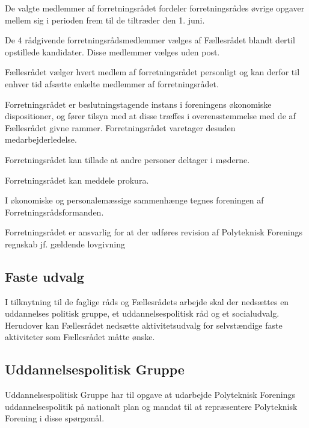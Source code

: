 \begin{list}
 De valgte medlemmer af forretningsrådet fordeler forretningsrådes øvrige opgaver mellem sig i perioden frem til de tiltræder den 1. juni.

 De 4 rådgivende forretningsrådsmedlemmer vælges af Fællesrådet blandt dertil opstillede kandidater. Disse medlemmer vælges uden post.

\item Fællesrådet vælger hvert medlem af forretningsrådet personligt og kan derfor til enhver tid afsætte enkelte medlemmer af forretningsrådet.
\item Forretningsrådet er beslutningstagende instans i foreningens økonomiske dispositioner, og fører tilsyn med at disse træffes i overensstemmelse med de af Fællesrådet givne rammer. Forretningsrådet varetager desuden medarbejderledelse.
\item Forretningsrådet kan tillade at andre personer deltager i møderne.
\item Forretningsrådet kan meddele prokura.
\item I økonomiske og personalemæssige sammenhænge tegnes foreningen af Forretningsrådsformanden.
\item Forretningsrådet er ansvarlig for at der udføres revision af Polyteknisk Forenings regnskab jf. gældende lovgivning	


\subsection{Faste udvalg}
\label{L:kap:fasteUdvalg}
\item I tilknytning til de faglige råds og Fællesrådets arbejde skal der nedsættes en uddannelses politisk gruppe, et uddannelsespolitisk råd og et socialudvalg. Herudover kan Fællesrådet nedsætte aktivitetsudvalg for selvstændige faste aktiviteter som Fællesrådet måtte ønske.


\subsection{Uddannelsespolitisk Gruppe}
\label{:UPG}
\item Uddannelsespolitisk Gruppe har til opgave at udarbejde Polyteknisk Forenings uddannelsespolitik på nationalt plan og mandat til at repræsentere Polyteknisk Forening i disse spørgsmål.


\end{list}
